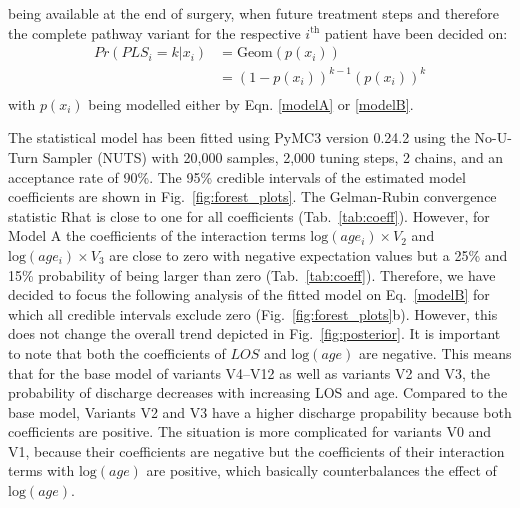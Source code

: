  being available at the end of surgery, when future treatment steps and therefore the complete pathway variant for the respective $i^\text{th}$ patient have been decided on:
\begin{equation}
\begin{split}
Pr(PLS_i=k|x_i) & = \text{Geom}\left(p(x_i)\right) \\
& = \left(1-p(x_i)\right)^{k-1}\left(p(x_i)\right)^{k} \\
\end{split}
\end{equation}
with $p(x_i)$ being modelled either by Eqn. \eqref{modelA} or
\eqref{modelB}.
    
The statistical model has been fitted using PyMC3
\citep{Salvatier2016_PyMC3} version 0.24.2 using the No-U-Turn Sampler
(NUTS) with 20,000 samples, 2,000 tuning steps, 2 chains, and an
acceptance rate of 90\%. The 95\% credible intervals of the estimated
model coefficients are shown in Fig.~\ref{fig:forest_plots}. The
Gelman-Rubin convergence statistic Rhat is close to one for all
coefficients (Tab.~\ref{tab:coeff}). 
However, for Model A the coefficients of the interaction terms
$\text{log}(age_i)\times V_2$ and $\text{log}(age_i)\times V_3$ are
close to zero with negative expectation values but a 25\% and 15\%
probability of being larger than zero (Tab.~\ref{tab:coeff}). 
Therefore, we have decided to focus the following analysis of the
fitted model on Eq.~\ref{modelB} for which all credible intervals
exclude zero (Fig.~\ref{fig:forest_plots}b).
However, this does not change the overall trend depicted in Fig.~\ref{fig:posterior}.
It is important to note that both the coefficients of $LOS$ and $\text{log}(age)$ are negative. This means that for the base model of variants V4--V12 as well as variants V2 and V3, the probability of discharge decreases with increasing LOS and age. 
Compared to the base model, Variants V2 and V3 have a higher discharge propability because both coefficients are positive. 
The situation is more complicated for variants V0 and V1, because their coefficients are negative but the coefficients of their interaction terms with $\text{log}(age)$ are positive, which basically counterbalances the effect of $\text{log}(age)$.

